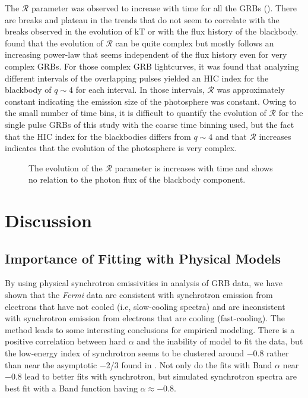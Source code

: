 The $\mathcal{R}$ parameter was observed to increase with time for all
the GRBs (). There are breaks and
plateau in the trends that do not seem to correlate with
the breaks observed in the evolution of kT or with the flux history of
the blackbody. \cite{Ryde:2009} found that the evolution of
$\mathcal{R}$ can be quite complex but mostly follows an increasing
power-law that seems independent of the flux history even for very
complex GRBs. For those complex GRB lightcurves, it was found that
analyzing different intervals of the overlapping pulses yielded an HIC
index for the blackbody of $q\sim 4$ for each interval. In those
intervals, $\mathcal{R}$ was approximately constant indicating the
emission size of the photosphere was constant. Owing to the small
number of time bins, it is difficult to quantify the evolution of
$\mathcal{R}$ for the single pulse GRBs of this study with the coarse
time binning used, but the fact that the HIC index for the blackbodies
differs from $q\sim 4$ and that $\mathcal{R}$ increases indicates that
the evolution of the photosphere is very complex.


\begin{figure}[h!]

  \centering








\caption{The evolution of the $\mathcal{R}$ parameter is increases
  with time and shows no relation to the photon flux of the blackbody
  component.}
   \label{fig:scR}

 \end{figure}

\section{Discussion }
\label{sec:discussion}
\subsection{ Importance of Fitting with Physical Models}


By using physical synchrotron emissivities in analysis of GRB data, we
have shown that the {\it Fermi} data are consistent with synchrotron
emission from electrons that have not cooled (i.e, slow-cooling
spectra) and are inconsistent with synchrotron emission from electrons
that are cooling (fast-cooling).  The method leads to some interesting
conclusions for empirical modeling.  There is a positive correlation
between hard $\alpha$ and the inability of model to fit the data, but
the low-energy index of synchrotron seems to be clustered around
$-$0.8 rather than near the asymptotic $-$2/3 found in
\cite{preece:1998}. Not only do the fits with Band $\alpha$ near
$-$0.8 lead to better fits with synchrotron, but simulated synchrotron
spectra are best fit with a Band function having $\alpha\approx -0.8$.



